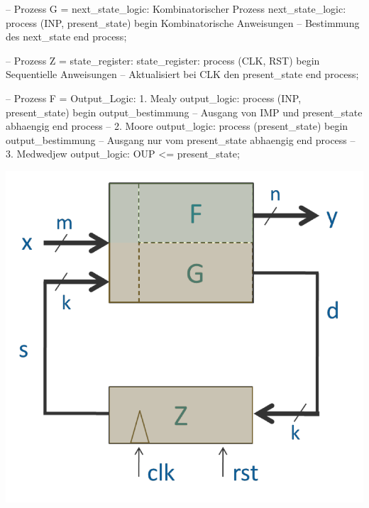 \begin{minipage}{.6\textwidth}
	\begin{VHDL}
-- Prozess G = next_state_logic: Kombinatorischer Prozess
	next_state_logic: process (INP, present_state)
	begin 
		{Kombinatorische Anweisungen} -- Bestimmung des next_state
	end process;
	
-- Prozess Z = state_register:
	state_register: process (CLK, RST)
	begin 
		{Sequentielle Anweisungen} -- Aktualisiert bei CLK den present_state
	end process;
 
-- Prozess F = Output_Logic: 1. Mealy
	output_logic: process (INP, present_state)
	begin
		{output_bestimmung} -- Ausgang von IMP und present_state abhaengig
	end process
-- 2. Moore
	output_logic: process (present_state)
	begin
		{output_bestimmung} -- Ausgang nur vom present_state abhaengig
	end process
-- 3. Medwedjew
	output_logic: OUP <= present_state;
	\end{VHDL}
\end{minipage}
\begin{minipage}{.4\textwidth}
	\includegraphics[width=\textwidth]{./bilder/ZMaschiene}
\end{minipage}
